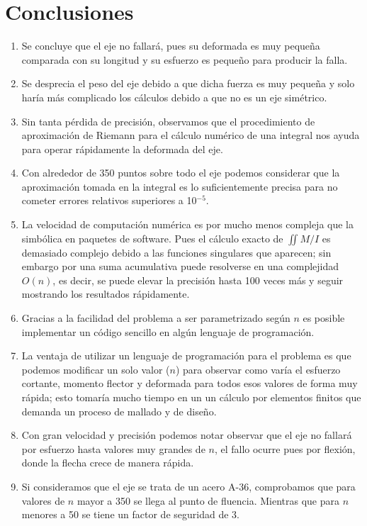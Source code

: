 \documentclass[a4paper,11pt]{report}
\begin{document}
\chapter{Conclusiones}
\begin{enumerate}
\item Se concluye que el eje no fallará, pues su deformada es muy pequeña comparada con su longitud y su esfuerzo es pequeño para producir la falla.
\item Se desprecia el peso del eje debido a que dicha fuerza es muy pequeña y solo haría más complicado los cálculos debido a que no es un eje simétrico.
\item Sin tanta pérdida de precisión, observamos que el procedimiento de aproximación de Riemann para el cálculo numérico de una integral nos ayuda para operar rápidamente la deformada del eje.
\item Con alrededor de 350 puntos sobre todo el eje podemos considerar que la aproximación tomada en la integral es lo suficientemente precisa para no cometer errores relativos superiores a 10$^{-5}$.
\item La velocidad de computación numérica es por mucho menos compleja que la simbólica en paquetes de software. Pues el cálculo exacto de $\iint M/I$ es demasiado complejo debido a las funciones singulares que aparecen; sin embargo por una suma acumulativa puede resolverse en una complejidad $O(n)$, es decir, se puede elevar la precisión hasta 100 veces más y seguir mostrando los resultados rápidamente.
\item Gracias a la facilidad del problema a ser parametrizado según $n$ es posible implementar un código sencillo en algún lenguaje de programación.
\item La ventaja de utilizar un lenguaje de programación para el problema es que podemos modificar un solo valor ($n$) para observar como varía el esfuerzo cortante, momento flector y deformada para todos esos valores de forma muy rápida; esto tomaría mucho tiempo en un un cálculo por elementos finitos que demanda un proceso de mallado y de diseño.
\item Con gran velocidad y precisión podemos notar observar que el eje no fallará por esfuerzo hasta valores muy grandes de $n$, el fallo ocurre pues por flexión, donde la flecha crece de manera rápida.
\item Si consideramos que el eje se trata de un acero A-36, comprobamos que para valores de $n$ mayor a 350 se llega al punto de fluencia. Mientras que para $n$ menores a 50 se tiene un factor de seguridad de 3.
\end{enumerate}
\end{document}

